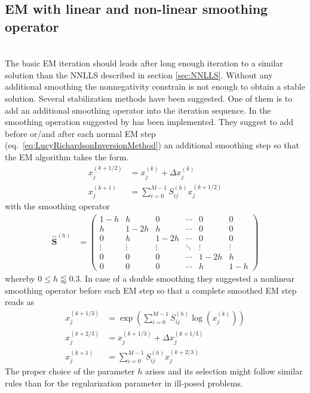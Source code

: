 \clearpage

\subsection{EM with linear and non-linear smoothing operator}~\\

The basic EM iteration should leads after long enough iteration to a similar solution than the NNLLS described in section \ref{sec:NNLLS}. Without any additional smoothing the nonnegativity constrain is not enough to obtain a stable solution. Several stabilization methods have been suggested. One of them is to add an additional smoothing operator into the iteration sequence. In \SASfit the smoothing operation  suggested by \cite{Eggermont1999,Eggermont1995,Byrne2011} has been implemented. They suggest to add before or/and after each normal EM step (eq.\ \ref{eq:LucyRichardsonInversionMethod}) an additional smoothing step so that the EM algorithm takes the form.
\begin{align}\label{eq:smoothedEMsingle}
  x_j^{(k+1/2)} &= x_j^{(k)} + \Delta x_j^{(k)}   \\
  x_j^{(k+1)} &= \displaystyle \sum_{i=0}^{M-1} S^{(h)}_{ij} x_j^{(k+1/2)}
\end{align}
with the smoothing operator
\begin{align}\label{eq:smoothingOperator}
  \hat{\mathbf{S}}^{(h)} &=
  \begin{pmatrix}
    1-h    & h      & 0      & \cdots & 0      & 0 \\
    h      & 1-2h   & h      & \cdots & 0      & 0 \\
    0      & h      & 1-2h   & \cdots & 0      & 0 \\
    \vdots & \vdots & \vdots & \ddots & \vdots & \vdots \\
    0      & 0      & 0      & \cdots & 1-2h   & h \\
    0      & 0      & 0      & \cdots & h      & 1-h
  \end{pmatrix}
\end{align}
whereby $0 \leq h \lessapprox 0.3$.
In case of a double smoothing they suggested a nonlinear smoothing operator before each EM step so that a complete smoothed EM step reads as
\begin{align}\label{eq:smoothedEMdouble}
  x_j^{(k+1/3)} &= \exp\left(\sum_{i=0}^{M-1} S^{(h)}_{ij} \log\left(x_j^{(k)}\right)\right)\\
  x_j^{(k+2/3)} &= x_j^{(k+1/3)} + \Delta x_j^{(k+1/3)}  \\
  x_j^{(k+1)} &= \displaystyle \sum_{i=0}^{M-1} S^{(h)}_{ij} x_j^{(k+2/3)}
\end{align}
The proper choice of the parameter $h$ arises and its selection might  follow similar rules than for the regularization parameter in ill-posed problems.
~\\
